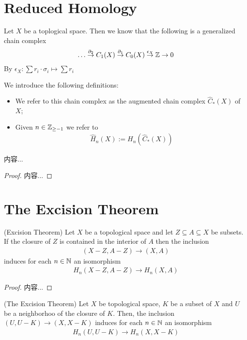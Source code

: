 \documentclass[Total.tex]{subfiles}
\begin{document}
		\section{Reduced Homology}
			\begin{Def}
				Let $X$ be a toplogical space. Then we know that the following is a generalized chain complex
				\begin{gather*}
					\dots\stackrel{\partial_2}{\rightarrow} C_1(X)\stackrel{\partial_1}{\rightarrow} C_0(X)\stackrel{\epsilon_X}{\rightarrow} \mathbb{Z}\rightarrow 0
				\end{gather*}
				By $\epsilon_X:\sum r_i\cdot \sigma_i\mapsto \sum r_i$
				
				We introduce the following definitions:
				\begin{itemize}
					\item We refer to this chain complex as the augmented chain complex $\hat{C}_*(X)$ of $X$;
					\item Given $n\in \mathbb{Z}_{\geq -1}$ we refer to
					\begin{gather*}
						\hat{H}_n(X):=H_n(\hat{C}_*(X))
					\end{gather*}
				\end{itemize}
			\end{Def}
			\begin{lemma}
				内容...
			\end{lemma}
			\begin{proof}
				内容...
			\end{proof}
		\section{The Excision Theorem}
			\begin{theorem}
				(Excision Theorem) Let $X$ be a topological space and let $Z\subseteq A\subseteq X$ be subsets. If the closure of $Z$ is contained in the interior of $A$ then the inclusion
				\begin{gather*}
					(X-Z,A-Z)\rightarrow (X,A)
				\end{gather*}
				induces for each $n\in \mathbb{N}$ an isomorphism
				\begin{gather*}
					H_n(X-Z,A-Z)\rightarrow H_n(X,A)
				\end{gather*}
			\end{theorem}
			\begin{proof}
				内容...
			\end{proof}
			\begin{theorem}
				(The Excision Theorem) Let $X$ be topological space, $K$ be a subset of $X$ and $U$ be a neighborhoo of the closure of $K$. Then, the inclusion $(U,U-K)\rightarrow (X,X-K)$ induces for each $n\in \mathbb{N}$ an isomorphism
				\begin{gather*}
					H_n(U,U-K)\rightarrow H_n(X,X-K)
				\end{gather*}
			\end{theorem}
\end{document}

